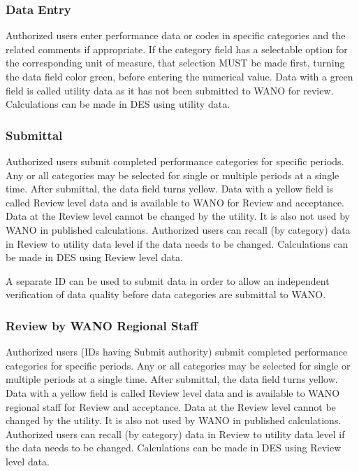 \subsubsection{Data Entry }

Authorized users enter performance data or codes in specific categories and the related comments if appropriate. If the category field has a selectable option for the corresponding unit of measure, that selection MUST be made first, turning the data field color green, before entering the numerical value. Data with a green field is called utility data as it has not been submitted to WANO for review. Calculations can be made in DES using utility data.

\subsubsection{Submittal}

Authorized users submit completed performance categories for specific periods.  Any or all categories may be selected for single or multiple periods at a single time. After submittal, the data field turns yellow. Data with a yellow field is called Review level data and is available to WANO for Review and acceptance. Data at the Review level cannot be changed by the utility. It is also not used by WANO in published calculations.   Authorized users can recall (by category) data in Review to utility data level if the data needs to be changed. Calculations can be made in DES using Review level data.

A separate ID can be used to submit data in order to allow an independent verification of data quality before data categories are submittal to WANO.

\subsubsection{Review by WANO Regional Staff}

Authorized users (IDs having Submit authority) submit completed performance categories for specific periods.  Any or all categories may be selected for single or multiple periods at a single time. After submittal, the data field turns yellow. Data with a yellow field is called Review level data and is available to WANO regional staff for Review and acceptance.  Data at the Review level cannot be changed by the utility. It is also not used by WANO in published calculations.  Authorized users can recall (by category) data in Review to utility data level if the data needs to be changed. Calculations can be made in DES using Review level data.

